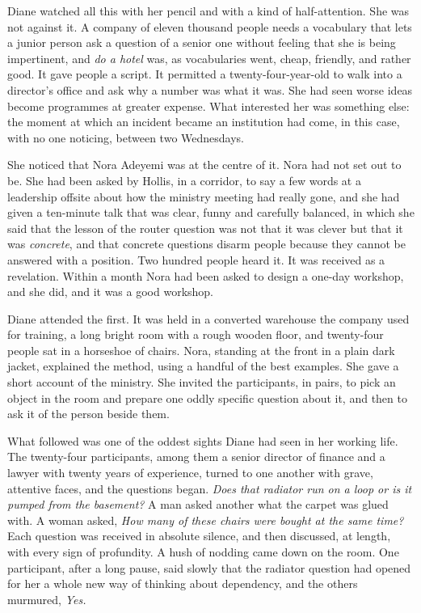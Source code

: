 Diane watched all this with her pencil and with a kind of half-attention. She was not against it. A company of eleven thousand people needs a vocabulary that lets a junior person ask a question of a senior one without feeling that she is being impertinent, and \emph{do a hotel} was, as vocabularies went, cheap, friendly, and rather good. It gave people a script. It permitted a twenty-four-year-old to walk into a director's office and ask why a number was what it was. She had seen worse ideas become programmes at greater expense. What interested her was something else: the moment at which an incident became an institution had come, in this case, with no one noticing, between two Wednesdays.

She noticed that Nora Adeyemi was at the centre of it. Nora had not set out to be. She had been asked by Hollis, in a corridor, to say a few words at a leadership offsite about how the ministry meeting had really gone, and she had given a ten-minute talk that was clear, funny and carefully balanced, in which she said that the lesson of the router question was not that it was clever but that it was \emph{concrete}, and that concrete questions disarm people because they cannot be answered with a position. Two hundred people heard it. It was received as a revelation. Within a month Nora had been asked to design a one-day workshop, and she did, and it was a good workshop.

Diane attended the first. It was held in a converted warehouse the company used for training, a long bright room with a rough wooden floor, and twenty-four people sat in a horseshoe of chairs. Nora, standing at the front in a plain dark jacket, explained the method, using a handful of the best examples. She gave a short account of the ministry. She invited the participants, in pairs, to pick an object in the room and prepare one oddly specific question about it, and then to ask it of the person beside them.

What followed was one of the oddest sights Diane had seen in her working life. The twenty-four participants, among them a senior director of finance and a lawyer with twenty years of experience, turned to one another with grave, attentive faces, and the questions began. \emph{Does that radiator run on a loop or is it pumped from the basement?} A man asked another what the carpet was glued with. A woman asked, \emph{How many of these chairs were bought at the same time?} Each question was received in absolute silence, and then discussed, at length, with every sign of profundity. A hush of nodding came down on the room. One participant, after a long pause, said slowly that the radiator question had opened for her a whole new way of thinking about dependency, and the others murmured, \emph{Yes.}

